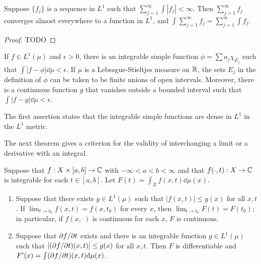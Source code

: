 \begin{theorem}
    Suppose $\{ f_j \}$ is a sequence in $L^1$ such that $\sum_{j=1}^{\infty} \int |f_j| < \infty$.
    Then $\sum_{j=1}^{\infty} f_j$ converges almost everywhere to a function in $L^1$, and $\int \sum_{j=1}^{\infty} f_j = \sum_{j=1}^{\infty} \int f_j$.
\end{theorem}

\begin{proof}
    TODO
\end{proof}

\begin{theorem}
    If $f \in L^{1} (\mu)$ and $\epsilon > 0$, there is an integrable simple function $\phi = \sum a_j \chi_{E_j}$ such that $\int |f - \phi| \dd \mu < \epsilon$.
    If $\mu$ is a Lebesgue-Stieltjes measure on $\mathbb{R}$, the sets $E_j$ in the definition of $\phi$ can be taken to be finite unions of open intervals.
    Moreover, there is a continuous function $g$ that vanishes outside a bounded interval such that $\int |f - g| \dd \mu < \epsilon$.
\end{theorem}

The first assertion states that the integrable simple functions are dense in $L^1$ in the $L^1$ metric.

The next theorem gives a criterion for the validity of interchanging a limit or a derivative with an integral. 

\begin{theorem}
    Suppose that $f: X \times [a, b] \to \mathbb{C}$ with $-\infty < a < b < \infty$ and that $f(\cdot, t): X \to \mathbb{C}$ is integrable for each $t \in [a, b]$.
    Let $F(t) = \int_X f(x,t) \dd \mu(x)$.
    \begin{enumerate}
        \item Suppose that there exists $g\in L^1(\mu)$ such that $|f(x,t)| \le g(x)$ for all $x, t$. If $\lim_{t \to t_0} f(x, t) = f(x, t_0)$ for every $x$, then $\lim_{t \to t_0} F(t) = F(t_0)$; in particular, if $f(x, \cdot)$ is continuous for each $x$, $F$ is continuous.
        \item Suppose that $\partial f / \partial t$ exists and there is an integrable function $g \in L^1(\mu)$ such that $|(\partial f / \partial t)(x, t)| \le g(x)$ for all $x, t$. Then $F$ is differentiable and $F'(x) = \int (\partial f / \partial t)(x,t) \mathrm{d} \mu(x)$.
    \end{enumerate} 
\end{theorem}

